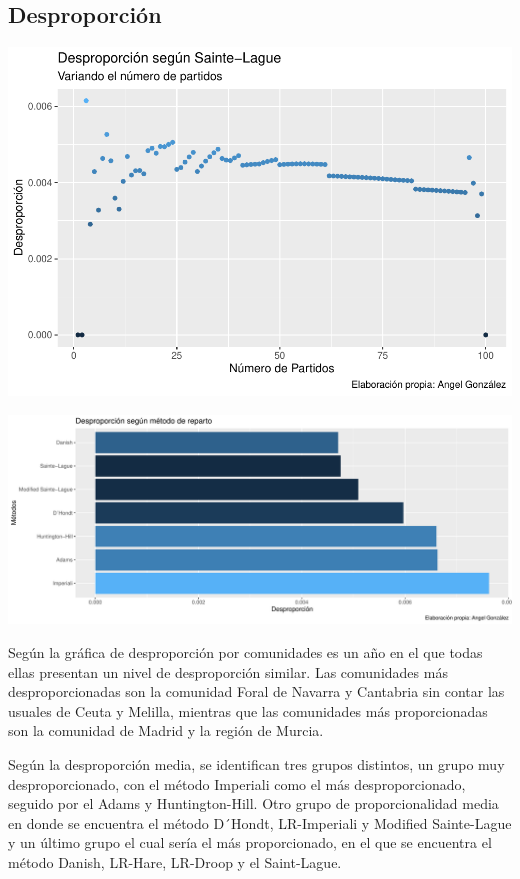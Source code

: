 \documentclass[12pt,a4paper,]{book}
\numberwithin{dummy}{section}
\theoremstyle{ocrenumbox}
\theoremstyle{blacknumex}
\theoremstyle{blacknumbox}
\theoremstyle{ocrenum}
\theoremstyle{ocrenum}
\begin{document}
\hypertarget{desproporciuxf3n-2}{%
\subsection{Desproporción}\label{desproporciuxf3n-2}}

\begin{center}\includegraphics[width=1\linewidth]{figurasR/unnamed-chunk-12-1} \end{center}

\begin{center}\includegraphics[width=1\linewidth]{figurasR/unnamed-chunk-12-2} \end{center}

Según la gráfica de desproporción por comunidades es un año en el que
todas ellas presentan un nivel de desproporción similar. Las comunidades
más desproporcionadas son la comunidad Foral de Navarra y Cantabria sin
contar las usuales de Ceuta y Melilla, mientras que las comunidades más
proporcionadas son la comunidad de Madrid y la región de Murcia.

Según la desproporción media, se identifican tres grupos distintos, un
grupo muy desproporcionado, con el método Imperiali como el más
desproporcionado, seguido por el Adams y Huntington-Hill. Otro grupo de
proporcionalidad media en donde se encuentra el método D´Hondt,
LR-Imperiali y Modified Sainte-Lague y un último grupo el cual sería el
más proporcionado, en el que se encuentra el método Danish, LR-Hare,
LR-Droop y el Saint-Lague.
\end{document}
